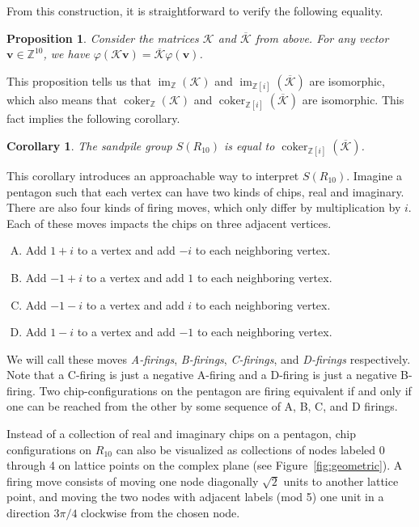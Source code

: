 \documentclass[12p]{amsart}
\numberwithin{equation}{section}
\theoremstyle{plain}
\newtheorem{prop}[thm]{Proposition}
\newtheorem{cor}[thm]{Corollary}
\theoremstyle{definition}
\newcommand{\Z}{\mathbb {Z}}
\newcommand{\mbf}{\mathbf}
\DeclareMathOperator{\im}{im}
\DeclareMathOperator{\coker}{coker}
\begin{document}
From this construction, it is straightforward to verify the following equality. 
\begin{prop}
    Consider the matrices $\mathcal K$ and $\overline{\mathcal K}$ from above. For any vector $\mbf v \in \Z^{10}$, we have $\varphi(\mathcal K \mbf v) = \overline{\mathcal K}\varphi(\mbf v)$.
\end{prop}

This proposition tells us that $\im_{\Z} (\mathcal K)$ and $\im_{\Z[i]} (\overline{\mathcal K})$ are isomorphic, which also means that $\coker_{\Z} (\mathcal K)$ and $\coker_{\Z[i]} (\overline{\mathcal K})$ are isomorphic. This fact implies the following corollary.

\begin{cor}
    The sandpile group $S(R_{10})$ is equal to $\coker_{\Z[i]} (\overline{\mathcal K})$. 
\end{cor}

This corollary introduces an approachable way to interpret $S(R_{10})$. Imagine a pentagon such that each vertex can have two kinds of chips, real and imaginary. There are also four kinds of firing moves, which only differ by multiplication by $i$. Each of these moves impacts the chips on three adjacent vertices. 


\begin{enumerate}[(A)]
    \item Add $1+i$ to a vertex and add $-i$ to each neighboring vertex. 
    \item Add $-1+i$ to a vertex and add $1$ to each neighboring vertex. 
    \item Add $-1-i$ to a vertex and add $i$ to each neighboring vertex. 
    \item Add $1-i$ to a vertex and add $-1$ to each neighboring vertex. 
\end{enumerate}

We will call these moves \emph{A-firings}, \emph{B-firings}, \emph{C-firings}, and \emph{D-firings} respectively. Note that a C-firing is just a negative A-firing and a D-firing is just a negative B-firing. Two chip-configurations on the pentagon are firing equivalent if and only if one can be reached from the other by some sequence of A, B, C, and D firings. 

Instead of a collection of real and imaginary chips on a pentagon, chip configurations on $R_{10}$ can also be visualized as collections of nodes labeled 0 through 4 on lattice points on the complex plane (see Figure~\ref{fig:geometric}). A firing move consists of moving one node diagonally $\sqrt2$ units to another lattice point, and moving the two nodes with adjacent labels (mod 5) one unit in a direction $3\pi/4$ clockwise from the chosen node. 
\end{document}
